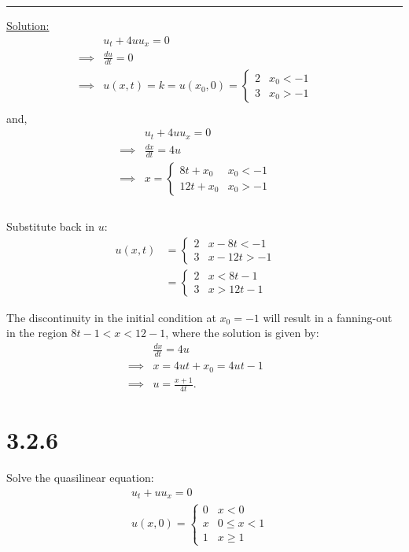 \documentclass{article}
\begin{document}
\begin{center}
  \noindent\rule{8cm}{0.4pt}
\end{center}

\underline{Solution:}
\begin{align*}
  &u_t + 4u u_x = 0 &&\\
  \implies& \frac{du}{dt} = 0 &&\\
  \implies& u(x,t) = k = u(x_0, 0) = \begin{cases}
    2 & x_0 < -1 \\
    3 & x_0 > -1
  \end{cases} &&\\
\end{align*}
and,
\begin{align*}
  &u_t + 4u u_x = 0 &&\\
  \implies& \frac{dx}{dt} = 4u &&\\
  \implies& x = \begin{cases}
    8t + x_0 & x_0 < -1 \\
    12t + x_0 & x_0 > -1
  \end{cases} &&\\ &&\\
\end{align*}

Substitute back in $u$:
\begin{align*}
  u(x,t) &= \begin{cases}
    2 & x-8t < -1 \\
    3 & x-12t > -1
  \end{cases} &&\\
  &= \begin{cases}
    2 & x < 8t-1 \\
    3 & x > 12t-1
  \end{cases}
\end{align*}

The discontinuity in the initial condition at $x_0 = -1$ will result in a fanning-out in the region $8t-1< x < 12 -1$, where the solution is given by:
\begin{align*}
  &\frac{dx}{dt} = 4u &&\\
  \implies& x = 4ut + x_0 = 4ut -1 &&\\
  \implies& u = \frac{x+1}{4t}.
\end{align*}

\newpage

\section*{3.2.6}
Solve the quasilinear equation:
\begin{align*}
  &u_t + u u_x = 0 &&\\
  &u(x,0) = \begin{cases}
    0 & x < 0 \\
    x & 0 \leq x < 1 \\
    1 & x \geq 1
  \end{cases}
\end{align*}
\end{document}
